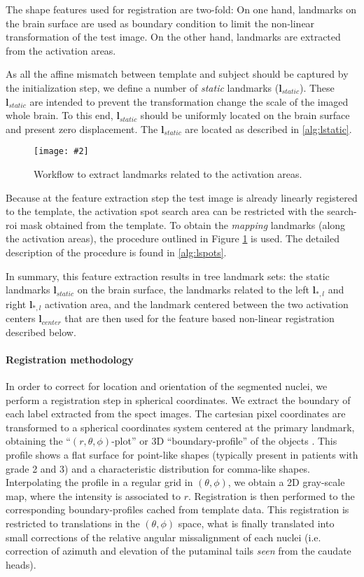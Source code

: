 \documentclass{frontiers}
\newcommand{\insertgraphic}[2]{\texttt{[image: \#2]}}
\newcommand{\insertgraphic}[2]{\texttt{[image: \#2]}}
\newcommand{\lm}[1]{\ensuremath{\mathbf{l}_{#1}}}
\begin{document}
The shape features used for registration are two-fold:
On one hand, landmarks on the brain surface are used as boundary condition to limit the non-linear 
  transformation of the test image. 
On the other hand, landmarks are extracted from the activation areas. 

As all the affine mismatch between template and subject should be captured by the initialization
  step, we define a number of \emph{static} landmarks (\lm{static}).
These \lm{static} are intended to prevent the 
  transformation change the scale of the imaged whole brain.
To this end, \lm{static} should be uniformly located on the brain surface and present
  zero displacement. The \lm{static} are located as described in \autoref{alg:lstatic}.

\begin{figure}
\centering
\insertgraphic{width=0.75\linewidth}{figures/03-Segflow}
\caption{ \label{fig:featlmextract} Workflow to extract landmarks related to the activation areas. 
}
\end{figure}

Because at the feature extraction step the test image is already linearly registered to the template, 
  the activation spot search area can be restricted with the search-\gls*{roi} mask obtained from the template.
To obtain the \emph{mapping} landmarks (along the activation areas), the procedure
  outlined in Figure \ref{fig:featlmextract} is used.
The detailed description of the procedure is found in \autoref{alg:lspots}.

In summary, this feature extraction results in tree landmark sets: the static landmarks \lm{static} on the 
  brain surface, the landmarks related to the left \lm{*,l} and right \lm{*,l} activation area, 
  and the  landmark centered between the two activation centers \lm{center} that are then used for the 
  feature based non-linear registration described below.

\paragraph{Registration methodology}
\label{sec:registration}
In order to correct for location and orientation of the segmented nuclei, we
  perform a registration step in spherical coordinates. We extract the boundary of
  each label extracted from the \gls*{spect} images. The cartesian pixel coordinates are
  transformed to a spherical coordinates system centered at the primary 
  landmark, obtaining the ``$(r,\theta,\phi)$-plot'' or 3D ``boundary-profile''
  of the objects \citep{davies_computer_2012}.
This profile shows a flat surface for point-like shapes (typically
  present in patients with grade 2 and 3) and a characteristic distribution for
  comma-like shapes. Interpolating the profile in a regular grid in $(\theta,\phi)$, 
  we obtain a 2D gray-scale map, where the intensity is associated to $r$.
Registration is then performed to the corresponding boundary-profiles cached from
  template data. This registration is restricted to translations in the
  $(\theta,\phi)$ space, what is finally translated into small corrections of
  the relative angular missalignment of each nuclei (i.e. correction of
  azimuth and elevation of the putaminal tails \emph{seen} from the caudate heads).
\end{document}
